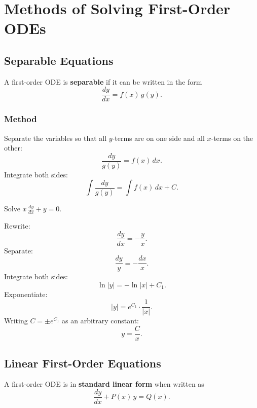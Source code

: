 \chapter{Methods of Solving First-Order ODEs}

\section{Separable Equations}

\begin{definition}
A first-order ODE is \textbf{separable} if it can be written in the form
\[
  \frac{dy}{dx} = f(x)\,g(y).
\]
\end{definition}

\subsection{Method}

Separate the variables so that all $y$-terms are on one side and all $x$-terms on the other:
\[
  \frac{dy}{g(y)} = f(x)\,dx.
\]
Integrate both sides:
\[
  \int \frac{dy}{g(y)} = \int f(x)\,dx + C.
\]

\begin{example}
Solve $\displaystyle x\,\frac{dy}{dx} + y = 0$.

\begin{solution}
Rewrite:
\[
  \frac{dy}{dx} = -\frac{y}{x}.
\]
Separate:
\[
  \frac{dy}{y} = -\frac{dx}{x}.
\]
Integrate both sides:
\[
  \ln|y| = -\ln|x| + C_1.
\]
Exponentiate:
\[
  |y| = e^{C_1}\cdot\frac{1}{|x|}.
\]
Writing $C = \pm e^{C_1}$ as an arbitrary constant:
\[
  \boxed{y = \frac{C}{x}.}
\]
\end{solution}
\end{example}

\section{Linear First-Order Equations}

\begin{definition}
A first-order ODE is in \textbf{standard linear form} when written as
\[
  \frac{dy}{dx} + P(x)\,y = Q(x).
\]
\end{definition}


